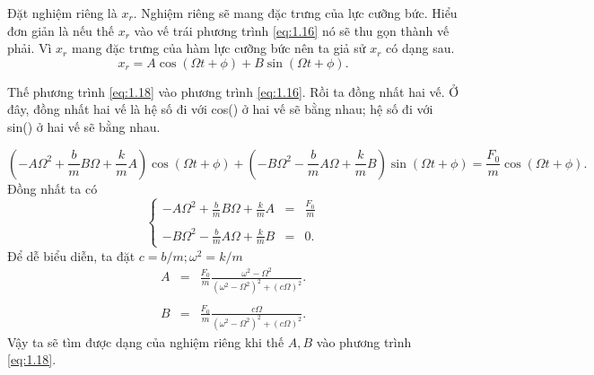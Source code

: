 Đặt nghiệm riêng là \(x_r\). Nghiệm riêng sẽ mang đặc trưng của lực cưỡng bức. Hiểu đơn giản là nếu thế $x_r$ vào vế trái phương trình \ref{eq:1.16} nó sẽ thu gọn thành vế phải. Vì \(x_r\) mang đặc trưng của hàm lực cưỡng bức nên ta giả sử \(x_r\) có dạng sau.
\begin{equation}
    x_r = A \cos{\left(\Omega t + \phi\right)} + B \sin{\left(\Omega t + \phi \right)}.
    \label{eq:1.18}
\end{equation}

Thế phương trình \ref{eq:1.18} vào phương trình \ref{eq:1.16}. Rồi ta đồng nhất hai vế. Ở đây, đồng nhất hai vế là hệ số đi với cos() ở hai vế sẽ bằng nhau; hệ số đi với sin() ở hai vế sẽ bằng nhau.

\begin{equation*}
    \left(-A \Omega^2 + {\displaystyle \frac{b}{m}} B \Omega + {\displaystyle \frac{k}{m}} A  \right) \cos{\left(\Omega t + \phi \right)} + \left(-B \Omega^2 - {\displaystyle \frac{b}{m}} A \Omega + {\displaystyle \frac{k}{m}} B \right) \sin{\left(\Omega t + \phi\right)} = {\displaystyle \frac{F_0}{m}} \cos{\left(\Omega t + \phi \right)}.
\end{equation*}
Đồng nhất ta có
\begin{equation*}
\left\{
    \begin{array}{ccc}
    -A \Omega^2 + {\displaystyle \frac{b}{m}} B \Omega + {\displaystyle \frac{k}{m}} A  &=& {\displaystyle \frac{F_0}{m}} 
    \\
    \\
    -B \Omega^2 - {\displaystyle \frac{b}{m}} A \Omega + {\displaystyle \frac{k}{m}} B  &=& 0.
    \end{array}
\right.         
\end{equation*}
Để dễ biểu diễn, ta đặt \(c = b/m; \omega^2 = k/m\)
\begin{equation}
    \begin{array}{ccc}
    A &=& \displaystyle \frac{F_0}{m} \frac{\omega^2 - \Omega^2}{\left(\omega^2 - \Omega^2 \right)^2 + \left( c \Omega \right)^2}. 
    \\
    \\
    B &=& \displaystyle \frac{F_0}{m} \frac{c \Omega}{\left(\omega^2 - \Omega^2 \right)^2 + \left( c \Omega \right)^2}.
    \end{array}
    \label{eq:1.19}
\end{equation}
Vậy ta sẽ tìm được dạng của nghiệm riêng khi thế \(A, B\) vào phương trình \ref{eq:1.18}. 
\vspace{2mm}

